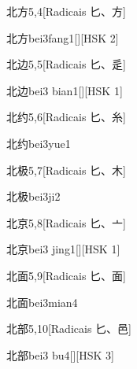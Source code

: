 \begin{entry}{北方}{5,4}[Radicais ⼔、⽅]
  \begin{phonetics}{北方}{bei3fang1}[][HSK 2]
  \end{phonetics}
\end{entry}

\begin{entry}{北边}{5,5}[Radicais ⼔、⾡]
  \begin{phonetics}{北边}{bei3 bian1}[][HSK 1]
  \end{phonetics}
\end{entry}

\begin{entry}{北约}{5,6}[Radicais ⼔、⽷]
  \begin{phonetics}{北约}{bei3yue1}
  \end{phonetics}
\end{entry}

\begin{entry}{北极}{5,7}[Radicais ⼔、⽊]
  \begin{phonetics}{北极}{bei3ji2}
  \end{phonetics}
\end{entry}

\begin{entry}{北京}{5,8}[Radicais ⼔、⼇]
  \begin{phonetics}{北京}{bei3 jing1}[][HSK 1]
  \end{phonetics}
\end{entry}

\begin{entry}{北面}{5,9}[Radicais ⼔、⾯]
  \begin{phonetics}{北面}{bei3mian4}
  \end{phonetics}
\end{entry}

\begin{entry}{北部}{5,10}[Radicais ⼔、⾢]
  \begin{phonetics}{北部}{bei3 bu4}[][HSK 3]
  \end{phonetics}
\end{entry}

